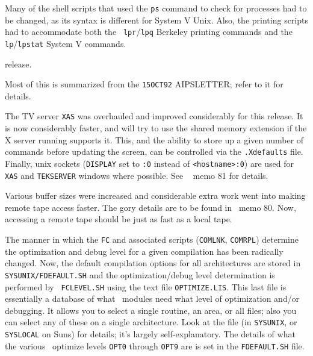 Many of the shell scripts that used the {\tt ps} command to check for
processes had to be changed, as its syntax is different for System V
Unix.  Also, the printing scripts had to accommodate both the {\tt
lpr}/{\tt lpq} Berkeley printing commands and the {\tt lp}/{\tt lpstat}
System V commands.

 release.

Most of this is summarized from the {\tt 15OCT92} AIPSLETTER; refer to
it for details.\medskip


The TV server {\tt XAS} was overhauled and improved considerably for
this release.  It is now considerably faster, and will try to use the
shared memory extension if the X server running supports it.  This, and
the ability to store up a given number of commands before updating the
screen, can be controlled via the {\tt .Xdefaults} file.  Finally, unix
sockets ({\tt DISPLAY} set to {\tt :0} instead of {\tt <hostname>:0})
are used for {\tt XAS} and {\tt TEKSERVER} windows where possible.  See
\AIPS~ memo 81 for details.\medskip


Various buffer sizes were increased and considerable extra work went
into making remote tape access faster.  The gory details are to be found
in \AIPS\ memo 80.  Now, accessing a remote tape should be just as fast
as a local tape.\medskip


The manner in which the {\tt FC} and associated scripts ({\tt COMLNK},
{\tt COMRPL}) determine the optimization and debug level for a given
compilation has been radically changed.  Now, the default compilation
options for all architectures are stored in {\tt\dol SYSUNIX/FDEFAULT.SH}
and the optimization/debug level determination is performed by {\tt
FCLEVEL.SH} using the text file {\tt OPTIMIZE.LIS}.  This last file is
essentially a database of what \AIPS\ modules need what level of
optimization and/or debugging.  It allows you to select a single
routine, an area, or all files; also you can select any of these on a
single architecture.  Look at the file (in {\tt\dol SYSUNIX}, or
{\tt\dol SYSLOCAL} on Suns) for details; it's largely self-explanatory.
The details of what the various \AIPS\ optimize levels {\tt OPT0}
through {\tt OPT9} are is set in the {\tt FDEFAULT.SH} file.\medskip



